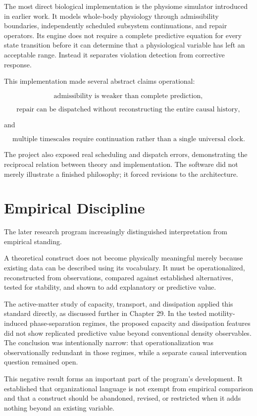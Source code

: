 \documentclass[11pt,oneside]{book}
\numberwithin{equation}{chapter}
\theoremstyle{definition}
\theoremstyle{plain}
\begin{document}
The most direct biological implementation is the physiome simulator
introduced in earlier work. It models whole-body physiology through
admissibility boundaries, independently scheduled subsystem continuations,
and repair operators. Its engine does not require a complete predictive
equation for every state transition before it can determine that a
physiological variable has left an acceptable range. Instead it separates
violation detection from corrective response.

This implementation made several abstract claims operational:

\[
\text{admissibility is weaker than complete prediction},
\]

\[
\text{repair can be dispatched without reconstructing the entire causal history},
\]

and

\[
\text{multiple timescales require continuation rather than a single universal clock}.
\]

The project also exposed real scheduling and dispatch errors, demonstrating
the reciprocal relation between theory and implementation. The software did
not merely illustrate a finished philosophy; it forced revisions to the
architecture.

\section{Empirical Discipline}

The later research program increasingly distinguished interpretation from
empirical standing.

A theoretical construct does not become physically meaningful merely
because existing data can be described using its vocabulary. It must be
operationalized, reconstructed from observations, compared against
established alternatives, tested for stability, and shown to add
explanatory or predictive value.

The active-matter study of capacity, transport, and dissipation applied
this standard directly, as discussed further in Chapter 29. In the tested
motility-induced phase-separation regimes, the proposed capacity and
dissipation features did not show replicated predictive value beyond
conventional density observables. The conclusion was intentionally narrow:
that operationalization was observationally redundant in those regimes,
while a separate causal intervention question remained open.

This negative result forms an important part of the program's development.
It established that organizational language is not exempt from empirical
comparison and that a construct should be abandoned, revised, or restricted
when it adds nothing beyond an existing variable.
\end{document}
